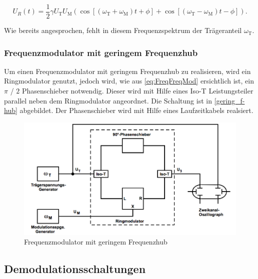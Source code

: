 \begin{equation}
U_R(t) = \frac{1}{2} \gamma U_\text{T} U_\text{M}  \left( \cos\left[(\omega_\text{T} + \omega_\text{M})t + \phi\right] + \cos\left[(\omega_\text{T} - \omega_\text{M})t - \phi \right] \right).
\end{equation}

\noindent Wie bereits angesprochen, fehlt in diesem Frequenzspektrum der Trägeranteil $\omega_\text{T}$.

\subsubsection{Frequenzmodulator mit geringem Frequenzhub}
Um einen Frequenzmodulator mit geringem Frequenzhub zu realisieren, wird ein Ringmodulator genutzt, jedoch wird, wie aus \autoref{eq:FreqFreqMod} ersichtlich ist, ein $\pi$ / $2$ Phasenschieber notwendig. Dieser wird mit Hilfe eines Iso-T Leistungsteiler parallel neben dem Ringmodulator angeordnet. Die Schaltung ist in \autoref{gering_f-hub} abgebildet. Der Phasenschieber wird mit Hilfe eines Laufzeitkabels realsiert.

\begin{figure}
	\centering
	\includegraphics[width=\textwidth]{img/Abb7.png}
	\caption{Frequenzmodulator mit geringem Frequenzhub \cite{FP}}
	\label{gering_f-hub}
\end{figure}

\subsection{Demodulationsschaltungen}

